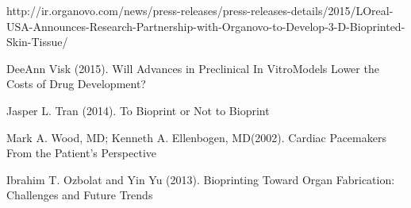\documentclass[12pt]{article} %
\begin{document}
\begin{thebibliography}{99}
\begin{small}
\newblock http://ir.organovo.com/news/press-releases/press-releases-details/2015/LOreal-USA-Announces-Research-Partnership-with-Organovo-to-Develop-3-D-Bioprinted-Skin-Tissue/

\newblock DeeAnn Visk (2015).
\newline Will Advances in Preclinical In VitroModels Lower the Costs of Drug Development?

\newblock Jasper L. Tran (2014).
\newline To Bioprint or Not to Bioprint

\newblock Mark A. Wood, MD; Kenneth A. Ellenbogen, MD(2002).
\newline Cardiac Pacemakers From the Patient’s Perspective

\newblock Ibrahim T. Ozbolat and Yin Yu (2013).
\newline Bioprinting Toward Organ Fabrication: Challenges and Future Trends


\end{small}
\end{thebibliography}

\end{document}
